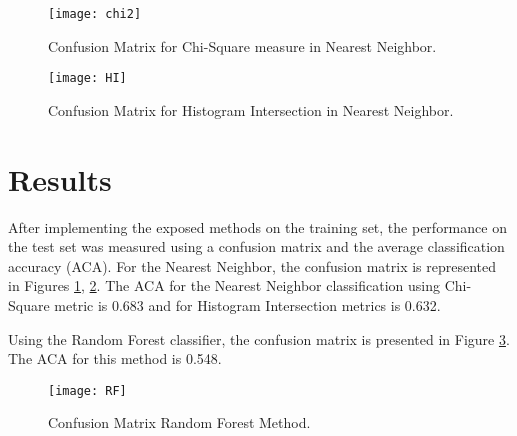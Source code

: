 \documentclass[10pt,twocolumn,letterpaper]{article}
\begin{document}
\begin{figure}[h]
\centering
\texttt{[image: chi2]}
\caption{Confusion Matrix for Chi-Square measure in Nearest Neighbor.}
\label{chi2ConfMat}
\centering
\end{figure}

\begin{figure}[h]
\centering
\texttt{[image: HI]}
\caption{Confusion Matrix for Histogram Intersection in Nearest Neighbor.}
\label{HIConfMat}
\centering
\end{figure}

\section{Results}
After implementing the exposed methods on the training set, the performance on the test set was measured using a confusion matrix and the average classification accuracy (ACA).
For the Nearest Neighbor, the confusion matrix is represented in Figures \ref{chi2ConfMat}, \ref{HIConfMat}. The ACA for the Nearest Neighbor classification using Chi-Square metric is 0.683 and for Histogram Intersection metrics is 0.632.

Using the Random Forest classifier, the confusion matrix is presented in Figure \ref{RFConfMat}. The ACA for this method is 0.548.
\begin{figure}[h]
\centering
\texttt{[image: RF]}
\caption{Confusion Matrix Random Forest Method.}
\label{RFConfMat}
\centering
\end{figure}
\end{document}

